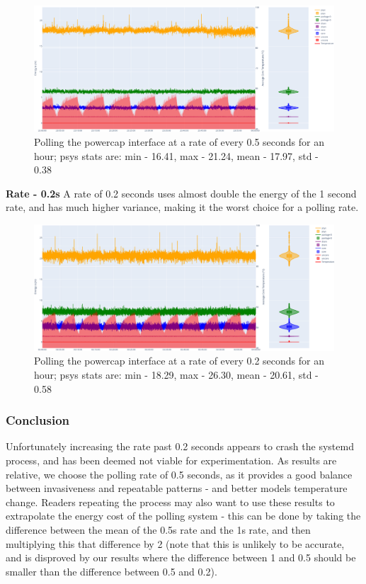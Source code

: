 \begin{figure}[H]
\centering
\includegraphics[width=15cm]{figures/implementation/control_systemd05}
\caption{Polling the powercap interface at a rate of every 0.5 seconds for an hour; psys stats are: min - 16.41, max - 21.24, mean - 17.97, std - 0.38}
\label{fig:systemd05ratetest}
\end{figure}

\textbf{Rate - 0.2s}
A rate of 0.2 seconds uses almost double the energy of the 1 second rate, and has much higher variance, making it the
worst choice for a polling rate.

\begin{figure}[H]
\centering
\includegraphics[width=15cm]{figures/implementation/control_systemd02}
\caption{Polling the powercap interface at a rate of every 0.2 seconds for an hour; psys stats are: min - 18.29, max - 26.30, mean - 20.61, std - 0.58}
\label{fig:systemd02ratetest}
\end{figure}


\subsubsection{Conclusion}
Unfortunately increasing the rate past 0.2 seconds appears to crash the systemd process, and has been deemed not viable
for experimentation.
As results are relative, we choose the polling rate of 0.5 seconds, as it provides a good balance between invasiveness
and repeatable patterns - and better models temperature change.
Readers repeating the process may also want to use these results to extrapolate the energy cost of the polling system -
this can be done by taking the difference between the mean of the 0.5s rate and the 1s rate, and then multiplying this
that difference by 2 (note that this is unlikely to be accurate, and is disproved by our results where the difference
between 1 and 0.5 should be smaller than the difference between 0.5 and 0.2).

